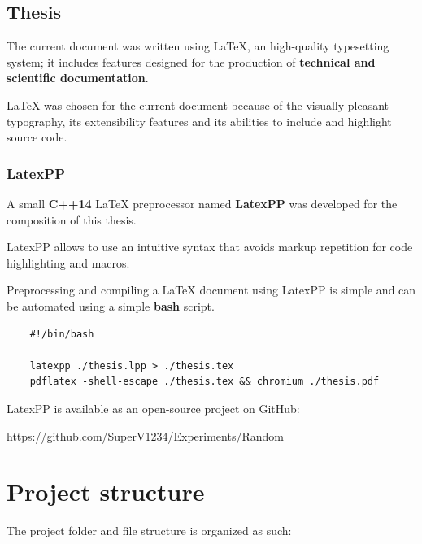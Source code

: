 \documentclass[12pt]{report}
\renewcommand\emph{\textbf}
\begin{document}
            \section{Thesis}
                The current document was written using \LaTeX{}, an high-quality typesetting system; it includes features designed for the production of \emph{technical and scientific documentation}.

                \LaTeX{} was chosen for the current document because of the visually pleasant typography, its extensibility features and its abilities to include and highlight source code.

                \subsection{LatexPP}
                    A small \emph{C++14} \LaTeX{} preprocessor named \emph{LatexPP} was developed for the composition of this thesis.

                    LatexPP allows to use an intuitive syntax that avoids markup repetition for code highlighting and macros.

                    Preprocessing and compiling a \LaTeX{} document using LatexPP is simple and can be automated using a simple \emph{bash} script.

\begin{verbatim}
    #!/bin/bash

    latexpp ./thesis.lpp > ./thesis.tex
    pdflatex -shell-escape ./thesis.tex && chromium ./thesis.pdf
\end{verbatim}

                    LatexPP is available as an open-source project on GitHub:

                    \url{https://github.com/SuperV1234/Experiments/Random}


        \chapter{Project structure}
            The project folder and file structure is organized as such:
\end{document}
